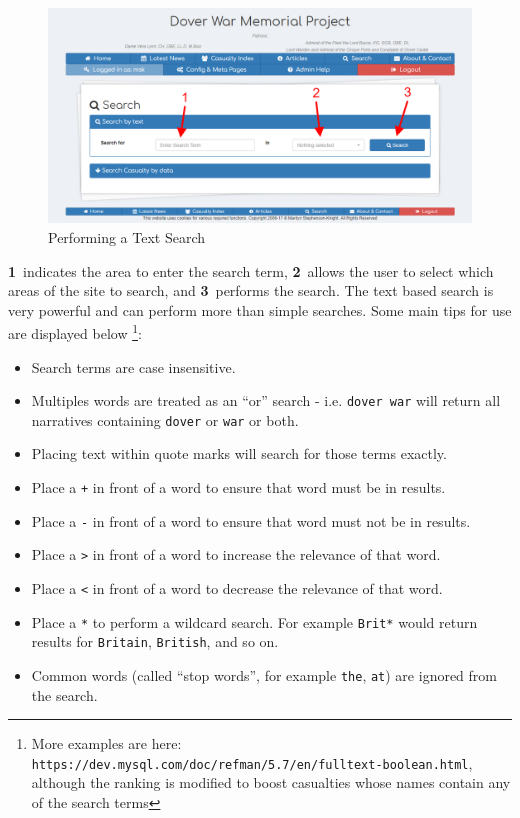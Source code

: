 \documentclass[12pt]{article}
\newcommand{\marker}[1]{\color{red}\textbf{#1}\color{black}}
\begin{document}
\begin{figure}[h]
  \centering
 \includegraphics[width=.9\textwidth]{pics/text_search.png}
	\caption{Performing a Text Search}\label{fig:text_search}
\end{figure}

\marker{1}\ indicates the area to enter the search term, \marker{2}\ allows the user to select which areas of the site to search, and \marker{3}\ performs the search. The text based search is very powerful and can perform more than simple searches. Some main tips for use are displayed below \footnote{More examples are here: \texttt{https://dev.mysql.com/doc/refman/5.7/en/fulltext-boolean.html}, although the ranking is modified to boost casualties whose names contain any of the search terms}:

\begin{itemize}
\item Search terms are case insensitive.
\item Multiples words are treated as an ``or'' search - i.e. \texttt{dover war} will return all narratives containing \texttt{dover} or \texttt{war} or both.
\item Placing text within quote marks will search for those terms exactly.
\item Place a \texttt{+} in front of a word to ensure that word must be in results.
\item Place a \texttt{-} in front of a word to ensure that word must not be in results.
\item Place a \texttt{>} in front of a word to increase the relevance of that word.
\item Place a \texttt{<} in front of a word to decrease the relevance of that word.
\item Place a \texttt{*} to perform a wildcard search.  For example \texttt{Brit*} would return results for  \texttt{Britain}, \texttt{British}, and so on.
\item Common words (called ``stop words'', for example \texttt{the}, \texttt{at}) are ignored from the search.
\end{itemize}
\end{document}
